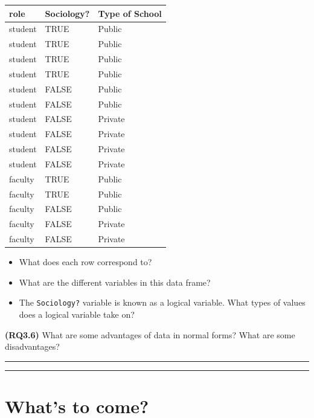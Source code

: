 \documentclass[]{tufte-book}
\let\oldrule=\rule
\renewcommand{\rule}[1]{\oldrule{\linewidth}}
\providecommand{\tightlist}{%
  \setlength{\itemsep}{0pt}\setlength{\parskip}{0pt}}
\begin{document}
\begin{tabular}{l|l|l}
\hline
role & Sociology? & Type of School\\
\hline
student & TRUE & Public\\
\hline
student & TRUE & Public\\
\hline
student & TRUE & Public\\
\hline
student & TRUE & Public\\
\hline
student & FALSE & Public\\
\hline
student & FALSE & Public\\
\hline
student & FALSE & Private\\
\hline
student & FALSE & Private\\
\hline
student & FALSE & Private\\
\hline
student & FALSE & Private\\
\hline
faculty & TRUE & Public\\
\hline
faculty & TRUE & Public\\
\hline
faculty & FALSE & Public\\
\hline
faculty & FALSE & Private\\
\hline
faculty & FALSE & Private\\
\hline
\end{tabular}

\begin{itemize}
\tightlist
\item
  What does each row correspond to?\\
\item
  What are the different variables in this data frame?\\
\item
  The \texttt{Sociology?} variable is known as a logical variable. What
  types of values does a logical variable take on?
\end{itemize}

\textbf{(RQ3.6)} What are some advantages of data in normal forms? What
are some disadvantages?

\begin{center}\rule{0.5\linewidth}{\linethickness}\end{center}

\begin{center}\rule{0.5\linewidth}{\linethickness}\end{center}

\section{What's to come?}\label{whats-to-come}
\end{document}
